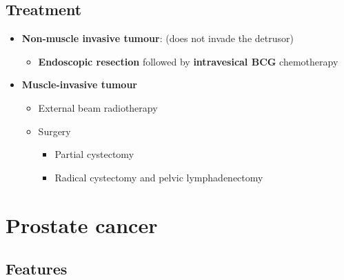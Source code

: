 \documentclass[
  14pt,
]{memoir}
\providecommand{\tightlist}{%
  \setlength{\itemsep}{0pt}\setlength{\parskip}{0pt}}
\begin{document}
\hypertarget{treatment-6}{%
\subsection{Treatment}\label{treatment-6}}

\begin{itemize}
\tightlist
\item
  \textbf{Non-muscle invasive tumour}: (does not invade the detrusor)

  \begin{itemize}
  \tightlist
  \item
    \textbf{Endoscopic resection} followed by \textbf{intravesical BCG}
    chemotherapy
  \end{itemize}
\item
  \textbf{Muscle-invasive tumour}

  \begin{itemize}
  \tightlist
  \item
    External beam radiotherapy
  \item
    Surgery

    \begin{itemize}
    \tightlist
    \item
      Partial cystectomy
    \item
      Radical cystectomy and pelvic lymphadenectomy
    \end{itemize}
  \end{itemize}
\end{itemize}

\pagebreak

\hypertarget{prostate-cancer}{%
\section{Prostate cancer}\label{prostate-cancer}}

\hypertarget{features-8}{%
\subsection{Features}\label{features-8}}
\end{document}
